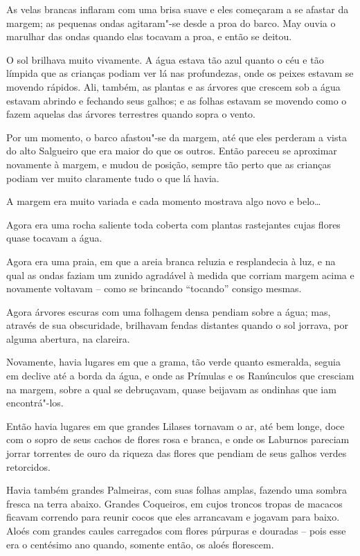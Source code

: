 As velas brancas inflaram com uma brisa suave e eles começaram a se
afastar da margem; as pequenas ondas agitaram"-se desde a proa do barco.
May ouvia o marulhar das ondas quando elas tocavam a proa, e então se
deitou.

O sol brilhava muito vivamente. A água estava tão azul quanto o céu e
tão límpida que as crianças podiam ver lá nas profundezas, onde os
peixes estavam se movendo rápidos. Ali, também, as plantas e as árvores
que crescem sob a água estavam abrindo e fechando seus galhos; e as
folhas estavam se movendo como o fazem aquelas das árvores terrestres
quando sopra o vento.

Por um momento, o barco afastou"-se da margem, até que eles perderam a
vista do alto Salgueiro que era maior do que os outros. Então pareceu se
aproximar novamente à margem, e mudou de posição, sempre tão perto que
as crianças podiam ver muito claramente tudo o que lá havia.

A margem era muito variada e cada momento mostrava algo novo e
belo…

Agora era uma rocha saliente toda coberta com plantas rastejantes cujas
flores quase tocavam a água.

Agora era uma praia, em que a areia branca reluzia e resplandecia à luz,
e na qual as ondas faziam um zunido agradável à medida que corriam
margem acima e novamente voltavam -- como se brincando ``tocando''
consigo mesmas.

Agora árvores escuras com uma folhagem densa pendiam sobre a água; mas,
através de sua obscuridade, brilhavam fendas distantes quando o sol
jorrava, por alguma abertura, na clareira.

Novamente, havia lugares em que a grama, tão verde quanto esmeralda,
seguia em declive até a borda da água, e onde as Prímulas e os
Ranúnculos que cresciam na margem, sobre a qual se debruçavam, quase
beijavam as ondinhas que iam encontrá"-los.

Então havia lugares em que grandes Lilases tornavam o ar, até bem longe,
doce com o sopro de seus cachos de flores rosa e branca, e onde os
Laburnos pareciam jorrar torrentes de ouro da riqueza das flores que
pendiam de seus galhos verdes retorcidos.

Havia também grandes Palmeiras, com suas folhas amplas, fazendo uma
sombra fresca na terra abaixo. Grandes Coqueiros, em cujos troncos
tropas de macacos ficavam correndo para reunir cocos que eles arrancavam
e jogavam para baixo. Aloés com grandes caules carregados com flores
púrpuras e douradas -- pois esse era o centésimo ano quando, somente
então, os aloés florescem.

